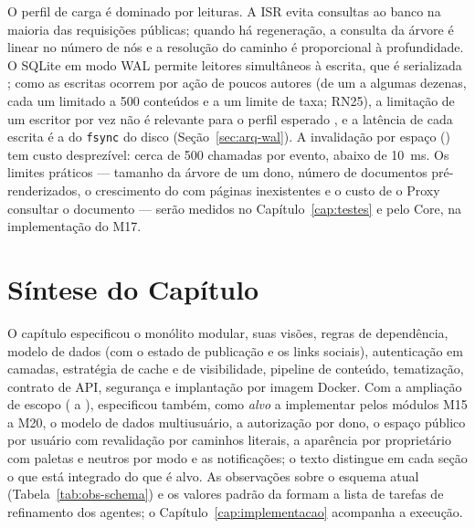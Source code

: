O perfil de carga é dominado por leituras. A ISR evita consultas ao banco na maioria das requisições públicas; quando há regeneração, a consulta da árvore é linear no número de nós e a resolução do caminho é proporcional à profundidade. O SQLite em modo WAL permite leitores simultâneos à escrita, que é serializada \cite{sqlitewal}; como as escritas ocorrem por ação de poucos autores (de um a algumas dezenas, cada um limitado a 500 conteúdos e a um limite de taxa; RN25), a limitação de um escritor por vez não é relevante para o perfil esperado \cite{sqlitewhentouse}, e a latência de cada escrita é a do \texttt{fsync} do disco (Seção~\ref{sec:arq-wal}). A invalidação por espaço () tem custo desprezível: cerca de 500 chamadas por evento, abaixo de 10~ms. Os limites práticos --- tamanho da árvore de um dono, número de documentos pré-renderizados, o crescimento do  com páginas inexistentes e o custo de o Proxy consultar o documento --- serão medidos no Capítulo~\ref{cap:testes} e pelo Core, na implementação do M17.

\section{Síntese do Capítulo}

O capítulo especificou o monólito modular, suas visões, regras de dependência, modelo de dados (com o estado de publicação e os links sociais), autenticação em camadas, estratégia de cache e de visibilidade, pipeline de conteúdo, tematização, contrato de API, segurança e implantação por imagem Docker. Com a ampliação de escopo ( a ), especificou também, como \emph{alvo} a implementar pelos módulos M15 a M20, o modelo de dados multiusuário, a autorização por dono, o espaço público por usuário com revalidação por caminhos literais, a aparência por proprietário com paletas e neutros por modo e as notificações; o texto distingue em cada seção o que está integrado do que é alvo. As observações sobre o esquema atual (Tabela~\ref{tab:obs-schema}) e os valores padrão da  formam a lista de tarefas de refinamento dos agentes; o Capítulo~\ref{cap:implementacao} acompanha a execução.
